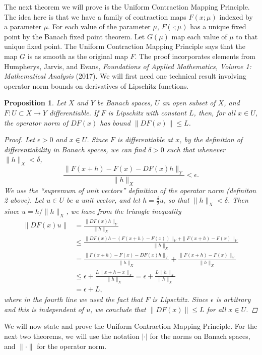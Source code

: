 \documentclass[12pt]{amsart}         %
\newtheorem{proposition}{Proposition}[section]
\theoremstyle{remark}
\begin{document}
The next theorem we will prove is the Uniform Contraction Mapping Principle. The idea here is that we have a family of contraction maps $F(x; \mu)$ indexed by a parameter $\mu$. For each value of the parameter $\mu$, $F(\cdot; \mu)$ has a unique fixed point by the Banach fixed point theorem. Let $G(\mu)$ map each value of $\mu$ to that unique fixed point. The Uniform Contraction Mapping Principle says that the map $G$ is as smooth as the original map $F$. The proof incorporates elements from Humpherys, Jarvis, and Evans, \emph{Foundations of Applied Mathematics, Volume 1: Mathematical Analysis} (2017). We will first need one technical result involving operator norm bounds on derivatives of Lipschitz functions. 

\begin{proposition}
Let $X$ and $Y$ be Banach spaces, $U$ an open subset of $X$, and $F: U \subset X \rightarrow Y$ differentiable. If $F$ is Lipschitz with constant $L$, then, for all $x \in U$, the operator norm of $DF(x)$ has bound $\|DF(x)\| \leq L$.
\begin{proof}
Let $\epsilon > 0$ and $x \in U$. Since $F$ is differentiable at $x$, by the definition of differentiability in Banach spaces, we can find $\delta > 0$ such that whenever $\|h\|_X < \delta$,
\[
\frac{\|F(x+h) - F(x) - DF(x)h\|_Y}{\|h\|_X} < \epsilon.
\]
We use the ``supremum of unit vectors'' definition of the operator norm (definiton 2 above). Let $u \in U$ be a unit vector, and let $h = \frac{\delta}{2}u$, so that $\|h\|_X < \delta$.
Then since $u = h/\|h\|_X$, we have from the triangle inequality
\begin{align*}
\|DF(x)u\| &= \frac{\|DF(x)h\|_Y}{\|h\|_X} \\
&\leq \frac{\|DF(x)h - (F(x+h) - F(x))\|_Y + \|F(x+h) - F(x)\|_Y }{\|h\|_X} \\
&= \frac{\|F(x+h) - F(x) - DF(x)h\|_Y }{\|h\|_X} + \frac{\|F(x+h) - F(x)\|_Y }{\|h\|_X} \\
&\leq \epsilon + \frac{L\|x + h - x\|_X}{\|h\|_X}
= \epsilon + \frac{L\|h\|_X}{\|h\|_X} \\
&= \epsilon + L,
\end{align*}
where in the fourth line we used the fact that $F$ is Lipschitz. Since $\epsilon$ is arbitrary and this is independent of $u$, we conclude that $\|DF(x)\| \leq L$ for all $x \in U$.
\end{proof}
\end{proposition}

We will now state and prove the Uniform Contraction Mapping Principle. For the next two theorems, we will use the notation $|\cdot|$ for the norms on Banach spaces, and $\|\cdot\|$
 for the operator norm.
\end{document}
